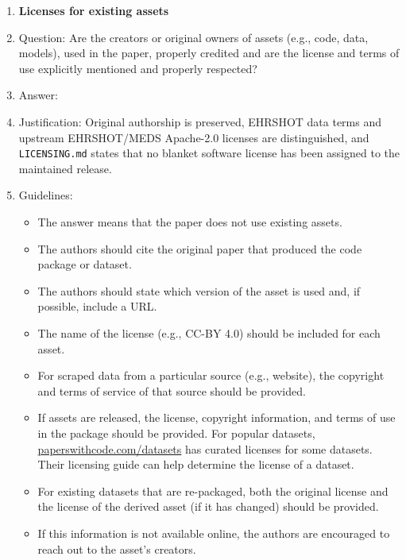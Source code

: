 \documentclass{article}
\begin{document}
\begin{enumerate}
\item {\bf Licenses for existing assets}
    \item[] Question: Are the creators or original owners of assets (e.g., code, data, models), used in the paper, properly credited and are the license and terms of use explicitly mentioned and properly respected?
    \item[] Answer: \answerYes{}
    \item[] Justification: Original authorship is preserved, EHRSHOT data terms and upstream EHRSHOT/MEDS Apache-2.0 licenses are distinguished, and \texttt{LICENSING.md} states that no blanket software license has been assigned to the maintained release.
    \item[] Guidelines:
    \begin{itemize}
        \item The answer \answerNA{} means that the paper does not use existing assets.
        \item The authors should cite the original paper that produced the code package or dataset.
        \item The authors should state which version of the asset is used and, if possible, include a URL\@.
        \item The name of the license (e.g., CC-BY 4.0) should be included for each asset.
        \item For scraped data from a particular source (e.g., website), the copyright and terms of service of that source should be provided.
        \item If assets are released, the license, copyright information, and terms of use in the package should be provided. For popular datasets, \url{paperswithcode.com/datasets} has curated licenses for some datasets. Their licensing guide can help determine the license of a dataset.
        \item For existing datasets that are re-packaged, both the original license and the license of the derived asset (if it has changed) should be provided.
        \item If this information is not available online, the authors are encouraged to reach out to the asset's creators.
    \end{itemize}


\end{enumerate}
\end{document}
